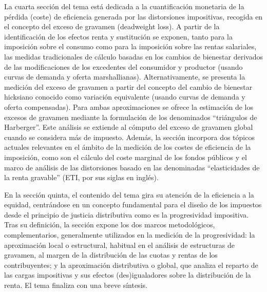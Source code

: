 \documentclass[10pt,a4paper]{article}
\begin{document}
La cuarta sección del tema está dedicada a la cuantificación monetaria de la pérdida (coste) de eficiencia generada por las distorsiones impositivas, recogida en el concepto del exceso de gravamen (deadweight loss). A partir de la identificación de los efectos renta y sustitución se exponen, tanto para la imposición sobre el consumo como para la imposición sobre las rentas salariales, las medidas tradicionales de cálculo basadas en los cambios de bienestar derivados de las modificaciones de los excedentes del consumidor y productor (usando curvas de demanda y oferta marshallianas). Alternativamente, se presenta la medición del exceso de gravamen a partir del concepto del cambio de bienestar hicksiano conocido como variación equivalente (usando curvas de demanda y oferta compensadas). Para ambas aproximaciones se ofrece la estimación de los excesos de gravamen mediante la formulación de los denominados “triángulos de Harberger”. Este análisis se extiende al cómputo del exceso de gravamen global cuando se considera más de impuesto. Además, la sección incorpora dos tópicos actuales relevantes en el ámbito de la medición de los costes de eficiencia de la imposición, como son el cálculo del coste marginal de los fondos públicos y el marco de análisis de las distorsiones basado en las denominadas “elasticidades de la renta gravable” (ETI, por sus siglas en inglés).

En la sección quinta, el contenido del tema gira su atención de la eficiencia a la equidad, centrándose en un concepto fundamental para el diseño de los impuestos desde el principio de justicia distributiva como es la progresividad impositiva. Tras su definición, la sección expone los dos marcos metodológicos, complementarios, generalmente utilizados en la medición de la progresividad: la aproximación local o estructural, habitual en el análisis de estructuras de gravamen, al margen de la distribución de las cuotas y rentas de los contribuyentes; y la aproximación distributiva o global, que analiza el reparto de las cargas impositivas y sus efectos (des)igualadores sobre la distribución de la renta. El tema finaliza con una breve síntesis.


\clearpage
\end{document}
